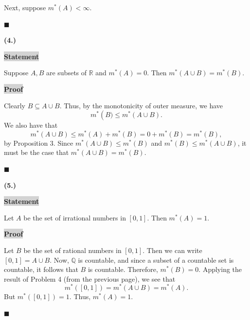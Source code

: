 \documentclass[12pt]{article}
\newcommand{\mybox}{%
    \collectbox{%
        \setlength{\fboxsep}{2pt}%
        \fbox{\BOXCONTENT}%
    }%
}
\begin{document}
Next, suppose $m^{*}(A) < \infty.$

\hfill$\blacksquare$

\pagebreak

\noindent \textbf{(4.)}

\vspace{3mm}

\noindent\mybox{\colorbox{lightgray}{\textbf{Statement}}}\hspace{3mm}\hrulefill

\noindent Suppose $A,B$ are subsets of $\mathbb{R}$ and $m^{*}(A) = 0.$ Then $m^{*}\left(A\cup B\right) = m^{*}(B).$

\vspace{5mm}

\noindent\mybox{\colorbox{lightgray}{\textbf{Proof}}}\hspace{3mm}\hrulefill

Clearly $B\subseteq A\cup B$. Thus, by the monotonicity of outer measure, we have $$m^{*}\left(B) \leq m^{*}(A\cup B).$$ We also have that $$m^{*}(A\cup B) \leq m^{*}(A) + m^{*}(B) = 0 + m^{*}(B) = m^{*}(B),$$ by Proposition 3. Since $m^{*}(A\cup B) \leq m^{*}(B)$ and $m^{*}(B) \leq m^{*}(A \cup B)$, it must be the case that $m^{*}(A\cup B) = m^{*}(B).$ 

\hfill$\blacksquare$

\pagebreak

\noindent \textbf{(5.)}

\vspace{3mm}

\noindent\mybox{\colorbox{lightgray}{\textbf{Statement}}}\hspace{3mm}\hrulefill

\noindent Let $A$ be the set of irrational numbers in $[0,1]$. Then $m^{*}(A) = 1.$

\vspace{5mm}

\noindent\mybox{\colorbox{lightgray}{\textbf{Proof}}}\hspace{3mm}\hrulefill

Let $B$ be the set of rational numbers in $[0,1]$. Then we can write $[0,1] = A \cup B$. Now, $\mathbb{Q}$ is countable, and since a subset of a countable set is countable, it follows that $B$ is countable. Therefore, $m^{*}(B) = 0$. Applying the result of Problem 4 (from the previous page), we see that
$$m^{*}([0,1])=m^{*}(A\cup B) = m^{*}(A).$$ But $m^{*}([0,1])=1.$ Thus, $m^{*}(A) = 1.$

\hfill$\blacksquare$
\end{document}
